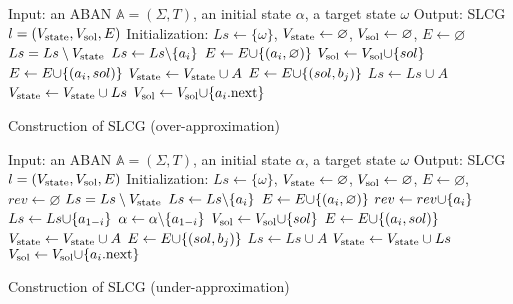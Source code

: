 \begin{algorithm}[ht]
\begin{algorithmic}
    \State Input: an ABAN $\mathbb{A}=(\Sigma,T)$, an initial state $\alpha$, a target state $\omega$
    \State Output: SLCG $l=(V_{\mathrm{state}},V_{\mathrm{sol}}, E)$
    \State Initialization: 
    $Ls\gets \{\omega\}$, $V_{\mathrm{state}}\gets\varnothing$, $V_{\mathrm{sol}}\gets \varnothing$, $E\gets \varnothing$
        \State $Ls=Ls\setminus V_{\mathrm{state}}$
    		\State $Ls\gets Ls\miset{a_i}$
    			\State $E\gets E\addset{(a_i,\varnothing)} $
        	\Else
        	    \State{\textcolor{gray}{// Choose the transitions reaching $a_i$}}
        		    \State $V_\sol\gets V_\sol\addset{sol}$
        		    \State $E\gets E\addset{(a_i,sol)} $
        			\State $V_{\mathrm{state}}\gets V_{\mathrm{state}}\cup{A}$
        				\State $E\gets E\addset{(sol,b_j)} $
        			\EndFor
        			\State $Ls\gets Ls\cup A$
                    \State $V_{\mathrm{state}}\gets V_{\mathrm{state}}\cup Ls$
        		\EndFor
        		\State$V_\sol\gets V_\sol\addset{a_i{\rm .next}}$           
        	\EndIf
    	\EndFor
    \EndWhile
    \State{}
\end{algorithmic}
\caption{Construction of SLCG (over-approximation)}\label{AlgConstructLCG}
\end{algorithm}

\begin{algorithm}[ht]
\begin{algorithmic}
    \State Input: an ABAN $\mathbb{A}=(\Sigma,T)$, an initial state $\alpha$, a target state $\omega$
    \State Output: SLCG $l=(V_{\mathrm{state}},V_{\mathrm{sol}}, E)$
    \State Initialization: 
    $Ls\gets \{\omega\}$, $V_{\mathrm{state}}\gets\varnothing$, $V_{\mathrm{sol}}\gets \varnothing$, $E\gets \varnothing$, $rev\gets \varnothing$
        \State $Ls=Ls\setminus V_{\mathrm{state}}$
    		\State $Ls\gets Ls\miset{a_i}$
    			\State $E\gets E\addset{(a_i,\varnothing)}$
    			\State $rev\gets rev\addset{a_i}$
        	\Else
        	        \State $Ls\gets Ls\addset{a_{1-i}}$
        	        \State $\alpha\gets\alpha\miset{a_{1-i}}$
        	    \EndIf
        	    \State{\textcolor{gray}{// Choose the transitions reaching $a_i$}}
        		    \State $V_\sol\gets V_\sol\addset{sol}$
        		    \State $E\gets E\addset{(a_i,sol)} $
        			\State $V_{\mathrm{state}}\gets V_{\mathrm{state}}\cup{A}$
        				\State $E\gets E\addset{(sol,b_j)} $
        			\EndFor
        			\State $Ls\gets Ls\cup A$
                    \State $V_{\mathrm{state}}\gets V_{\mathrm{state}}\cup Ls$
        		\EndFor
        		\State$V_\sol\gets V_\sol\addset{a_i{\rm .next}}$           
        	\EndIf
    	\EndFor
    \EndWhile
    \State{}
\end{algorithmic}
\caption{Construction of SLCG (under-approximation)}\label{AlgConstructLCGUnder}
\end{algorithm}

